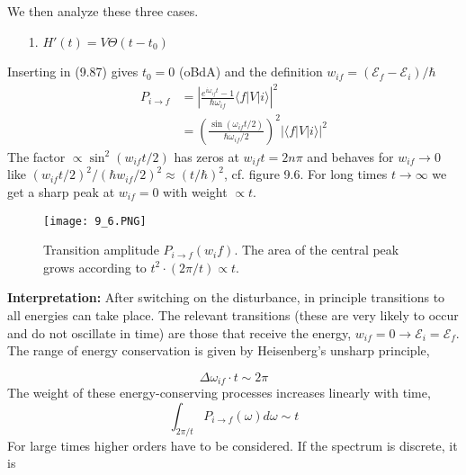 We then analyze these three cases.
\begin{enumerate}
    \item[1.] $H' (t) = V \Theta (t - t_0)$
\end{enumerate}
Inserting in (9.87) gives $t_0 = 0$ (oBdA) and the definition $w_{if} = (\mathcal{E}_f - \mathcal{E}_i) / \hbar$
\begin{equation}
\begin{aligned} P_{i \rightarrow f} &=\left|\frac{e^{i \omega_{i f} t}-1}{\hbar \omega_{i f}}\langle f|V| i\rangle\right|^{2} \\ &=\left(\frac{\sin \left(\omega_{i f} t / 2\right)}{\hbar \omega_{i f} / 2}\right)^{2}|\langle f|V| i\rangle|^{2} \end{aligned}
\end{equation}
The factor $\propto \operatorname{sin}^2(w_{if}t/2)$ has zeros at $w_{if}t=2n\pi$ and behaves for $w_{if}\rightarrow 0$ like $(w_{if}t/2)^2/(\hbar w_{if}/2)^2\approx(t/\hbar)^2$, cf. figure 9.6. For long times $t\rightarrow \infty$ we get a sharp peak at $w_{if}=0$ with weight $\propto t$.
\begin{figure}[ht]
    \begin{minipage}{0.5\textwidth}
        \centering
        \texttt{[image: 9\_6.PNG]}
    \end{minipage}
    \begin{minipage}{0.5\textwidth}
        \caption{Transition amplitude $P_{i \rightarrow f} (w_if)$. The area of the central peak grows according to $t^2\cdot(2\pi/t)\propto t$.}
    \end{minipage}
\end{figure}

\textbf{Interpretation:} After switching on the disturbance, in principle transitions to all energies can take place. The relevant transitions (these are very likely to occur and do not oscillate in time) are those that receive the energy, $w_{if}=0\rightarrow \mathcal{E}_i=\mathcal{E}_f$. The range of energy conservation is given by Heisenberg's unsharp principle,

\begin{equation}
    \Delta \omega_{i f} \cdot t \sim 2 \pi
    \end{equation}
The weight of these energy-conserving processes increases linearly with time,
\begin{equation}
    \int_{2 \pi / t} P_{i \rightarrow f}(\omega) d \omega \sim t
    \end{equation}
For large times higher orders have to be considered. If the spectrum is discrete, it is

